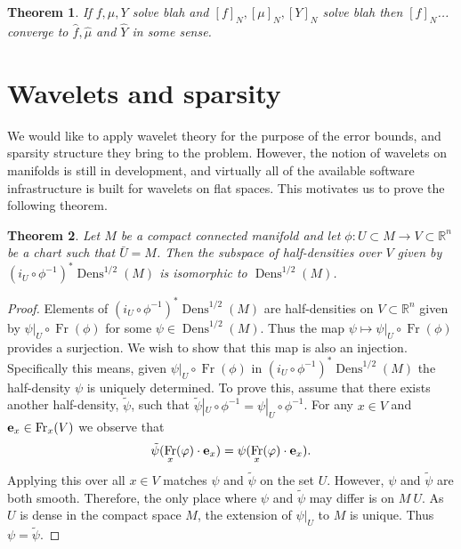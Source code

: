 \documentclass[12pt]{amsart}
\newtheorem{thm}{Theorem}[section]
\DeclareMathOperator{\Dens}{Dens}
\DeclareMathOperator{\Fr}{Fr}
\begin{document}
\begin{thm}
	If $f,\mu,Y$ solve blah and $[f]_N,[\mu]_N, [Y]_N$ solve blah
	then $[f]_N$... converge to $\hat{f},\hat{\mu}$ and $\widehat{Y}$ in some sense.
\end{thm}


\section{Wavelets and sparsity}
\label{sec:wavelets}
We would like to apply wavelet theory for the purpose of the error bounds,
and sparsity structure they bring to the problem.
However, the notion of wavelets on manifolds is still in development,
and virtually all of the available software infrastructure is built for wavelets on flat spaces.
This motivates us to prove the following theorem.

\begin{thm} \label{thm:global_chart}
  Let $M$ be a compact connected manifold and let
  $\phi:U \subset M \to V \subset \mathbb{R}^n$
  be a chart such that $\bar{U} = M$.
  Then the subspace of half-densities over $V$ given by
  $(i_U \circ \phi^{-1})^* \Dens^{1/2}(M)$ is isomorphic
  to $\Dens^{1/2}(M)$.
\end{thm}
\begin{proof}
  Elements of $(i_U \circ \phi^{-1})^* \Dens^{1/2}(M)$
  are half-densities on $V \subset \mathbb{R}^n$ given by $ \left. \psi \right|_{U} \circ \Fr(\phi)$ for some $\psi \in \Dens^{1/2}(M)$.
  Thus the map $\psi \mapsto \psi|_U \circ \Fr(\phi)$ provides a surjection.
  We wish to show that this map is also an injection.
  Specifically this means, given $\left. \psi \right|_{U} \circ \Fr(\phi)$ in $(i_U \circ \phi^{-1})^*\Dens^{1/2}(M)$ the half-density $\psi$ is uniquely determined.
  To prove this, assume that there exists another half-density,
  $\tilde{\psi}$, such that $\tilde{\psi}|_U \circ \phi^{-1} = \psi|_U \circ \phi^{-1}$.
  For any $x \in V$ and ${\bf e}_x \in \Fr_x(V)$ we observe that
  \begin{align*}
    \tilde{\psi}( \Fr_x(\varphi) \cdot {\bf e}_x) = \psi( \Fr_x( \varphi) \cdot {\bf e}_x).
  \end{align*}
  Applying this over all $x \in V$ matches $\psi$ and $\tilde{\psi}$ on the set $U$.
  However, $\psi$ and $\tilde{\psi}$ are both smooth.
  Therefore, the only place where $\psi$ and $\tilde{\psi}$ may differ is on $M \ U$.
  As $U$ is dense in the compact space $M$,
  the extension of $\psi|_U$ to $M$ is unique.
  Thus $\psi = \tilde{\psi}$.
\end{proof}
\end{document}
